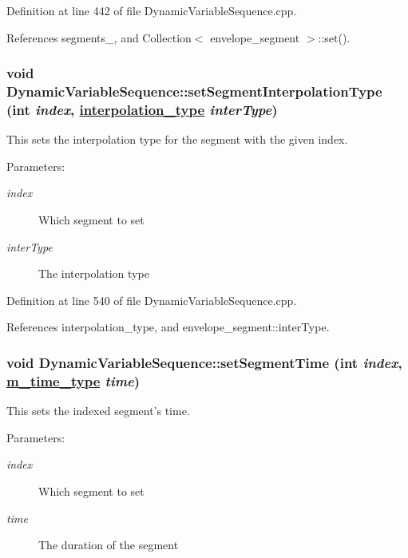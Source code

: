 Definition at line 442 of file Dynamic\-Variable\-Sequence.cpp.

References segments\_\-, and Collection$<$ envelope\_\-segment $>$::set().\hypertarget{classDynamicVariableSequence_a23}{
\subsubsection[setSegmentInterpolationType]{\setlength{\rightskip}{0pt plus 5cm}void Dynamic\-Variable\-Sequence::set\-Segment\-Interpolation\-Type (int {\em index}, \hyperlink{Types_8h_a13}{interpolation\_\-type} {\em inter\-Type})}}
\label{classDynamicVariableSequence_a23}


This sets the interpolation type for the segment with the given index. \begin{Desc}
\item[Parameters:]
\begin{description}
\item[{\em index}]Which segment to set \item[{\em inter\-Type}]The interpolation type \end{description}
\end{Desc}


Definition at line 540 of file Dynamic\-Variable\-Sequence.cpp.

References interpolation\_\-type, and envelope\_\-segment::inter\-Type.\hypertarget{classDynamicVariableSequence_a19}{
\subsubsection[setSegmentTime]{\setlength{\rightskip}{0pt plus 5cm}void Dynamic\-Variable\-Sequence::set\-Segment\-Time (int {\em index}, \hyperlink{Types_8h_a2}{m\_\-time\_\-type} {\em time})}}
\label{classDynamicVariableSequence_a19}


This sets the indexed segment's time. \begin{Desc}
\item[Parameters:]
\begin{description}
\item[{\em index}]Which segment to set \item[{\em time}]The duration of the segment \end{description}
\end{Desc}


